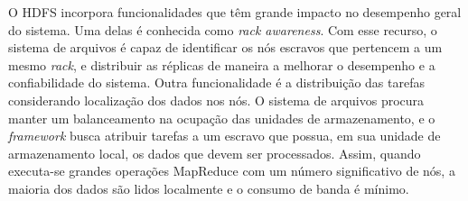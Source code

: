 O HDFS incorpora funcionalidades que têm grande impacto no desempenho geral do sistema.
Uma delas é conhecida como \textit{rack awareness}. Com esse recurso, o sistema de arquivos é capaz de identificar os nós escravos que pertencem a um mesmo \textit{rack}, e distribuir as réplicas de maneira a melhorar o desempenho e a confiabilidade do sistema.
Outra funcionalidade é a distribuição das tarefas considerando localização dos dados nos nós. O sistema de arquivos procura manter um balanceamento na ocupação das unidades de armazenamento, e o \textit{framework} busca atribuir tarefas a um escravo que possua, em sua unidade de armazenamento local, os dados que devem ser processados.
Assim, quando executa-se grandes operações MapReduce com um número significativo de nós, a maioria dos dados são lidos localmente e o consumo de banda é mínimo.